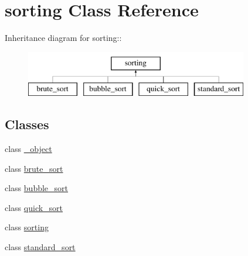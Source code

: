 \hypertarget{classsorting}{
\section{sorting Class Reference}
\label{df/d42/classsorting}
}
Inheritance diagram for sorting::\begin{figure}[H]
\begin{center}
\leavevmode
\includegraphics[height=2cm]{df/d42/classsorting}
\end{center}
\end{figure}
\subsection*{Classes}
\begin{DoxyCompactItemize}
\item 
class \hyperlink{classsorting_1_1__object}{\_\-object}
\item 
class \hyperlink{classsorting_1_1brute__sort}{brute\_\-sort}
\item 
class \hyperlink{classsorting_1_1bubble__sort}{bubble\_\-sort}
\item 
class \hyperlink{classsorting_1_1quick__sort}{quick\_\-sort}
\item 
class \hyperlink{classsorting_1_1sorting}{sorting}
\item 
class \hyperlink{classsorting_1_1standard__sort}{standard\_\-sort}
\end{DoxyCompactItemize}
